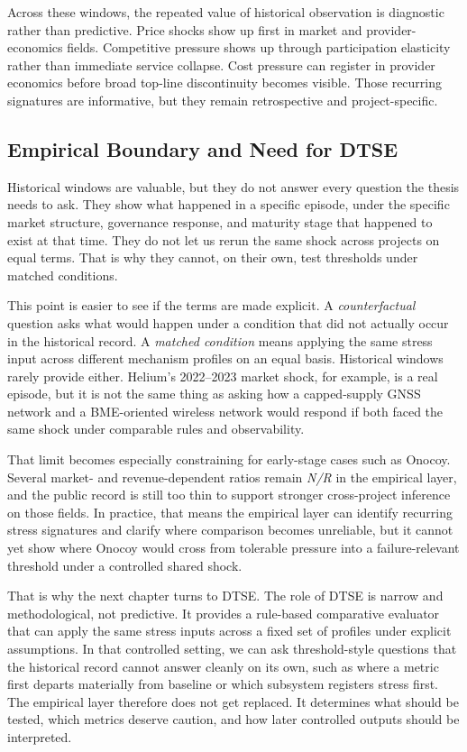 Across these windows, the repeated value of historical observation is diagnostic rather than predictive. Price shocks show up first in market and provider-economics fields. Competitive pressure shows up through participation elasticity rather than immediate service collapse. Cost pressure can register in provider economics before broad top-line discontinuity becomes visible. Those recurring signatures are informative, but they remain retrospective and project-specific.

\subsection{Empirical Boundary and Need for DTSE}
Historical windows are valuable, but they do not answer every question the thesis needs to ask. They show what happened in a specific episode, under the specific market structure, governance response, and maturity stage that happened to exist at that time. They do not let us rerun the same shock across projects on equal terms. That is why they cannot, on their own, test thresholds under matched conditions.

This point is easier to see if the terms are made explicit. A \emph{counterfactual} question asks what would happen under a condition that did not actually occur in the historical record. A \emph{matched condition} means applying the same stress input across different mechanism profiles on an equal basis. Historical windows rarely provide either. Helium's 2022--2023 market shock, for example, is a real episode, but it is not the same thing as asking how a capped-supply GNSS network and a BME-oriented wireless network would respond if both faced the same shock under comparable rules and observability.

That limit becomes especially constraining for early-stage cases such as Onocoy. Several market- and revenue-dependent ratios remain \emph{N/R} in the empirical layer, and the public record is still too thin to support stronger cross-project inference on those fields. In practice, that means the empirical layer can identify recurring stress signatures and clarify where comparison becomes unreliable, but it cannot yet show where Onocoy would cross from tolerable pressure into a failure-relevant threshold under a controlled shared shock.

That is why the next chapter turns to DTSE. The role of DTSE is narrow and methodological, not predictive. It provides a rule-based comparative evaluator that can apply the same stress inputs across a fixed set of profiles under explicit assumptions. In that controlled setting, we can ask threshold-style questions that the historical record cannot answer cleanly on its own, such as where a metric first departs materially from baseline or which subsystem registers stress first. The empirical layer therefore does not get replaced. It determines what should be tested, which metrics deserve caution, and how later controlled outputs should be interpreted.
